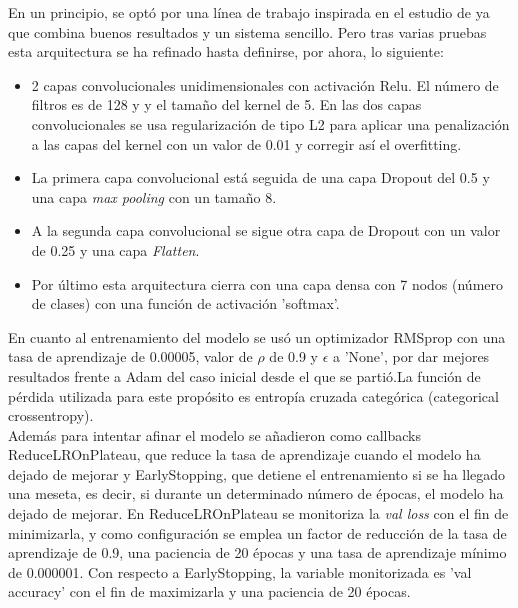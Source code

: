 \documentclass[11pt,a4paper,spanish]{book}
\begin{document}
	En un principio, se optó por una línea de trabajo inspirada en el estudio de \cite{AbdulQayyum2019} ya que combina buenos resultados y un sistema sencillo. Pero tras varias pruebas esta arquitectura se ha refinado hasta definirse, por ahora, lo siguiente:
	
	\begin{itemize}
		\item 2 capas convolucionales unidimensionales con activación Relu. El número de filtros es de 128 y  y el tamaño del kernel de 5.
		En las dos capas convolucionales se usa regularización de tipo L2 para aplicar una penalización a las capas del kernel con un valor de 0.01 y corregir así el overfitting.
		
		\item La primera capa convolucional está seguida de una capa Dropout del 0.5 y una capa \emph{max pooling} con un tamaño 8.
		
		\item A la segunda capa convolucional se sigue otra capa de Dropout con un valor de 0.25 y una capa \emph{Flatten}.
		
		\item Por último esta arquitectura cierra con una capa densa con 7 nodos (número de clases) con una función de activación 'softmax'.
	\end{itemize}
	En cuanto al entrenamiento del modelo se usó un optimizador RMSprop con una tasa de aprendizaje de 0.00005, valor de $\rho$ de 0.9 y $\epsilon$ a 'None', por dar mejores resultados frente a Adam del caso inicial desde el que se partió.La función de pérdida utilizada para este propósito es entropía cruzada categórica (categorical crossentropy).\\
	
	Además para intentar afinar el modelo se añadieron como callbacks ReduceLROnPlateau, que reduce la tasa de aprendizaje cuando el modelo ha dejado de mejorar y EarlyStopping, que detiene el entrenamiento si se ha llegado una meseta, es decir, si durante un determinado número de épocas, el modelo ha dejado de mejorar. En ReduceLROnPlateau se monitoriza la \emph{val loss} con el fin de minimizarla, y como configuración se emplea un factor de reducción de la tasa de aprendizaje de 0.9, una paciencia de 20 épocas y una tasa de aprendizaje mínimo de 0.000001.
	Con respecto a EarlyStopping, la variable monitorizada es 'val accuracy' con el fin de maximizarla y una paciencia de 20 épocas.
	
\end{document}
